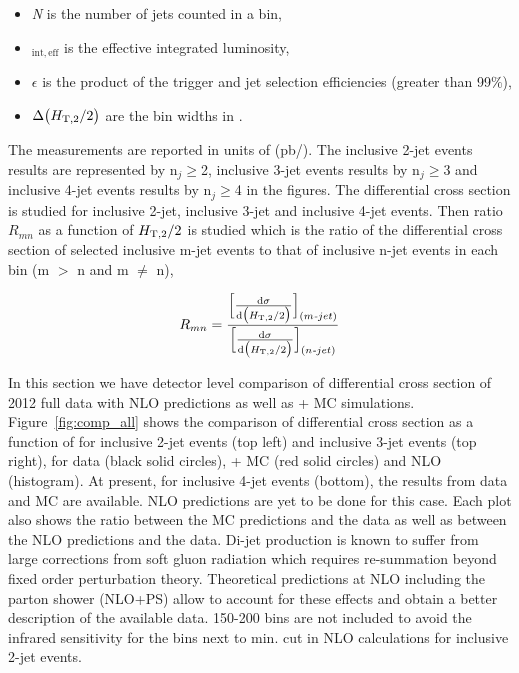 \begin{itemize}
\item \textit{N} is the number of jets counted in a bin,
\item \lumins$_{\mathrm{int,eff}}$ is the effective integrated luminosity,
\item $\epsilon$ is the product of the trigger and jet selection efficiencies (greater than 99$\%$),
\item $\Delta\big(H_{\mathrm{T,2}}/2\big)$ are the bin widths in \httwo.
\end{itemize}

The measurements are reported in units of (pb/\GeVns). The inclusive 2-jet
events results are represented by n$_{j} \geq $2, inclusive 3-jet
events results by n$_{j} \geq $3 and inclusive 4-jet
events results by n$_{j} \geq $4 in the figures.
The differential cross section is studied for inclusive 2-jet, inclusive 3-jet and inclusive 4-jet events. Then ratio $R_{mn}$ 
as a function of $H_{\mathrm{T,2}}/2$ is studied which is the ratio of the differential cross section of selected inclusive m-jet events 
to that of inclusive n-jet events in each \httwo bin (m $>$ n and m $\neq$ n), 

\begin{equation}
  \label{eqn:ratio}
  R_{mn} = \frac{\Big[{\dd{\sigma}{\big(\httwo\big)}}\Big]_{(m\textit{-}jet)}}{\Big[{\dd{\sigma}{\big(\httwo\big)}}\Big]_
    {(n\textit{-}jet)}}
\end{equation}

In this section we have detector level comparison of differential cross section of 2012 full data with NLO predictions as well as
\MadGraphF + \PYTHIAS MC simulations. Figure~\ref{fig:comp_all} shows the comparison of differential cross section as a function of \httwo 
for inclusive 2-jet events (top left) and inclusive 3-jet events (top right), for data (black solid circles), \MadGraphF + \PYTHIAS 
MC (red solid circles) and NLO (histogram). At present, for inclusive 4-jet events (bottom), the results from data and MC are available. 
NLO predictions are yet to be done for this case. Each plot also shows the ratio between the MC predictions 
and the data as well as between the NLO predictions and the data. Di-jet production is 
known to suffer from large corrections from soft gluon radiation which requires re-summation beyond fixed order perturbation theory. 
Theoretical predictions at NLO including the parton shower (NLO+PS) allow to account for these effects and obtain a better description of 
the available data. 150-200 bins are not included to avoid the infrared sensitivity for the bins next to min. \pt cut in NLO calculations 
for inclusive 2-jet events.

